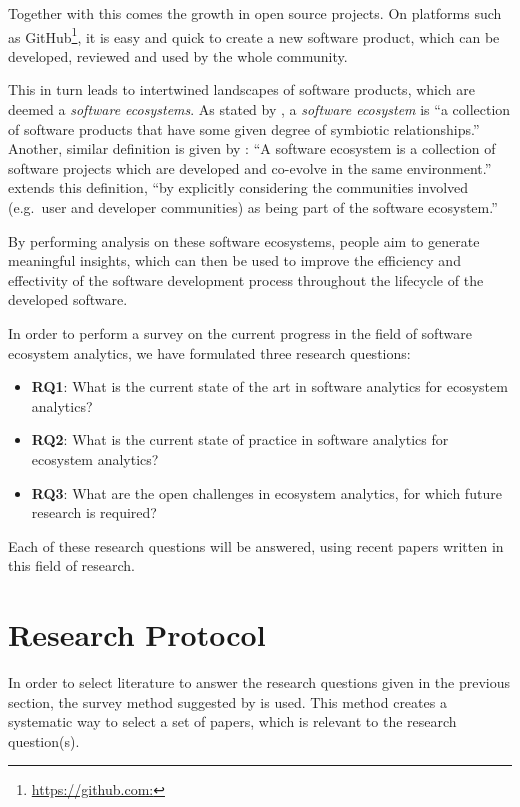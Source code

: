 \documentclass[]{book}
\providecommand{\tightlist}{%
  \setlength{\itemsep}{0pt}\setlength{\parskip}{0pt}}
\let\rmarkdownfootnote\footnote%
\def\footnote{\protect\rmarkdownfootnote}
\begin{document}
Together with this comes the growth in open source projects. On
platforms such as GitHub\footnote{\url{https://github.com:}}, it is easy
and quick to create a new software product, which can be developed,
reviewed and used by the whole community.

This in turn leads to intertwined landscapes of software products, which
are deemed a \emph{software ecosystems}. As stated by
\citet{Messerschmitt2003}, a \emph{software ecosystem} is ``a collection
of software products that have some given degree of symbiotic
relationships.'' Another, similar definition is given by
\citet{Lungu2009}: ``A software ecosystem is a collection of software
projects which are developed and co-evolve in the same environment.''
\citet{Mens2013} extends this definition, ``by explicitly considering
the communities involved (e.g.~user and developer communities) as being
part of the software ecosystem.''

By performing analysis on these software ecosystems, people aim to
generate meaningful insights, which can then be used to improve the
efficiency and effectivity of the software development process
throughout the lifecycle of the developed software.

In order to perform a survey on the current progress in the field of
software ecosystem analytics, we have formulated three research
questions:

\begin{itemize}
\tightlist
\item
  \textbf{RQ1}: What is the current state of the art in software
  analytics for ecosystem analytics?
\item
  \textbf{RQ2}: What is the current state of practice in software
  analytics for ecosystem analytics?
\item
  \textbf{RQ3}: What are the open challenges in ecosystem analytics, for
  which future research is required?
\end{itemize}

Each of these research questions will be answered, using recent papers
written in this field of research.

\section{Research Protocol}\label{research-protocol-3}

In order to select literature to answer the research questions given in
the previous section, the survey method suggested by
\citet{Kitchenham2004} is used. This method creates a systematic way to
select a set of papers, which is relevant to the research question(s).
\end{document}
